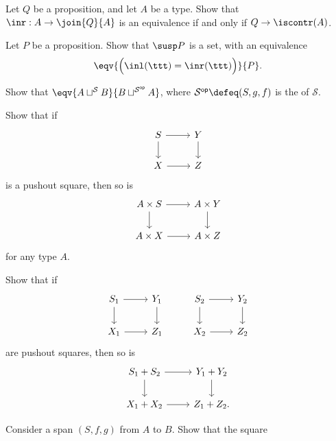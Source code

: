 \begin{exercises}
\begin{subexenum}
\end{subexenum}
\item Let $Q$ be a proposition, and let $A$ be a type. Show that $\inr:A\to \join{Q}{A}$ is an equivalence if and only if $Q\to\iscontr(A)$.
\item Let $P$ be a proposition. Show that $\susp P$ is a set, with an equivalence
\begin{equation*}
\eqv{\Big(\inl(\ttt)=\inr(\ttt)\Big)}{P}.
\end{equation*}
\item Show that $\eqv{A\sqcup^{\mathcal{S}} B}{B\sqcup^{\mathcal{S}^{\mathsf{op}}} A}$, where $\mathcal{S^{\mathsf{op}}}\defeq (S,g,f)$ is the  of $\mathcal{S}$. 
\item Show that if
\begin{equation*}
\begin{tikzcd}
S \arrow[r] \arrow[d] & Y \arrow[d] \\
X \arrow[r] & Z
\end{tikzcd}
\end{equation*}
is a pushout square, then so is
\begin{equation*}
\begin{tikzcd}
A\times S \arrow[r] \arrow[d] & A\times Y \arrow[d] \\
A\times X \arrow[r] & A\times Z
\end{tikzcd}
\end{equation*}
for any type $A$.
\item Show that if
\begin{equation*}
\begin{tikzcd}
S_1 \arrow[r] \arrow[d] & Y_1 \arrow[d] & S_2 \arrow[r] \arrow[d] & Y_2 \arrow[d] \\
X_1 \arrow[r] & Z_1 & X_2 \arrow[r] & Z_2
\end{tikzcd}
\end{equation*}
are pushout squares, then so is
\begin{equation*}
\begin{tikzcd}
S_1+S_2 \arrow[r] \arrow[d] & Y_1+ Y_2 \arrow[d] \\
X_1 +X_2 \arrow[r] & Z_1+Z_2. 
\end{tikzcd}
\end{equation*}
\item 
\begin{subexenum}
\item Consider a span $(S,f,g)$ from $A$ to $B$. Show that the square
\begin{equation*}

\end{equation*}
\end{subexenum}
\end{exercises}

